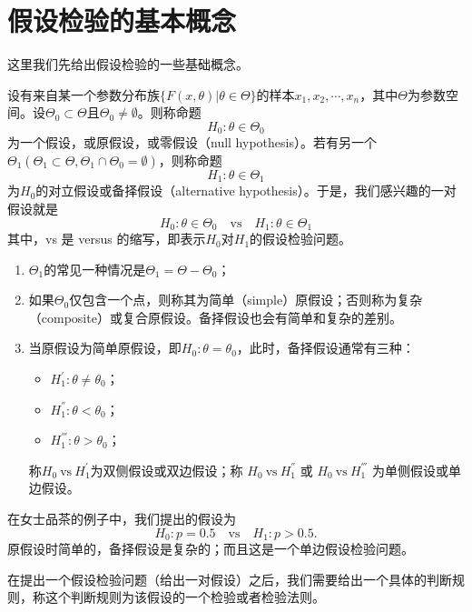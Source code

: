 \section{假设检验的基本概念}
这里我们先给出假设检验的一些基础概念。
\begin{definition}
设有来自某一个参数分布族$\{F(x,\theta)|\theta \in \Theta\}$的样本$x_1,x_2,\cdots,x_n$，其中$\Theta$为参数空间。设$\Theta_0 \subset \Theta$且$\Theta_0 \neq \emptyset$。则称命题
$$
H_0 : \theta \in \Theta_0
$$
为一个假设，或原假设，或零假设（null hypothesis）。若有另一个$\Theta_1 (\Theta_1 \subset \Theta, \Theta_1 \cap \Theta_0 = \emptyset)$，则称命题
$$
H_1 : \theta \in \Theta_1 
$$
为$H_0$的对立假设或备择假设（alternative hypothesis）。于是，我们感兴趣的一对假设就是
$$
H_0: \theta \in \Theta_0 \quad \text{vs} \quad H_1: \theta \in \Theta_1
$$
其中，vs 是 versus 的缩写，即表示$H_0$对$H_1$的假设检验问题。
\end{definition}
\begin{remark}
    \begin{enumerate}
        \item $\Theta_1$的常见一种情况是$\Theta_1 = \Theta-\Theta_0$；
        \item 如果$\Theta_0$仅包含一个点，则称其为简单（simple）原假设；否则称为复杂（composite）或复合原假设。备择假设也会有简单和复杂的差别。
        \item 当原假设为简单原假设，即$H_0:\theta = \theta_0$，此时，备择假设通常有三种：
        \begin{itemize}
            \item $H_1^{'}: \theta \neq \theta_0$；
            \item $H_1^{''}: \theta < \theta_0$；
            \item $H_1^{'''}: \theta > \theta_0$；
        \end{itemize}
        称$H_0 \ \text{vs} \  H_1^{'}$为双侧假设或双边假设；称 $H_0 \  \text{vs} \  H_1^{''}$ 或 $H_0 \  \text{vs} \  H_1^{'''}$ 为单侧假设或单边假设。
    \end{enumerate}
\end{remark}
\begin{example}
    在女士品茶的例子中，我们提出的假设为
    $$
    H_0: p = 0.5 \quad \text{vs} \quad H_1: p>0.5.
    $$
    原假设时简单的，备择假设是复杂的；而且这是一个单边假设检验问题。
\end{example}

在提出一个假设检验问题（给出一对假设）之后，我们需要给出一个具体的判断规则，称这个判断规则为该假设的一个检验或者检验法则。

